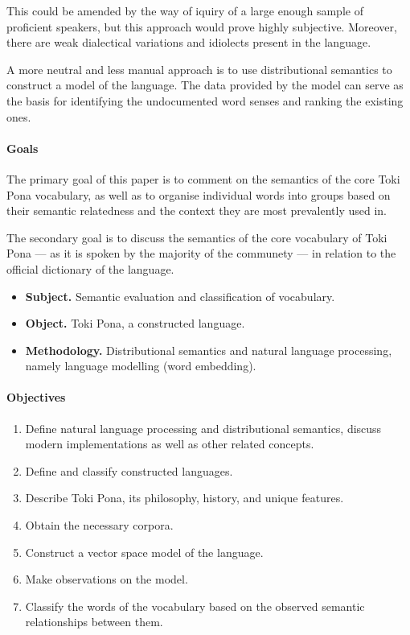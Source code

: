\documentclass[14pt, a4paper]{extreport}
\begin{document}
This could be amended by the way of iquiry of a large enough sample of proficient speakers, but this approach would prove highly subjective. Moreover, there are weak dialectical variations and idiolects present in the language.

A more neutral and less manual approach is to use distributional semantics to construct a model of the language. The data provided by the model can serve as the basis for identifying the undocumented word senses and ranking the existing ones.
\paragraph{Goals}
The primary goal of this paper is to comment on the semantics of the core Toki Pona vocabulary, as well as to organise individual words into groups based on their semantic relatedness and the context they are most prevalently used in.

The secondary goal is to discuss the semantics of the core vocabulary of Toki Pona --- as it is spoken by the majority of the communety --- in relation to the official dictionary of the language.

\begin{itemize}
  \item \textbf{Subject.} Semantic evaluation and classification of vocabulary.
  \item \textbf{Object.} Toki Pona, a constructed language.
  \item \textbf{Methodology.} Distributional semantics and natural language processing, namely language modelling (word embedding).
\end{itemize}
\paragraph{Objectives}
\begin{enumerate}
  \item Define natural language processing and distributional semantics, discuss modern implementations as well as other related concepts.
  \item Define and classify constructed languages.
  \item Describe Toki Pona, its philosophy, history, and unique features.
  \item Obtain the necessary corpora.
  \item Construct a vector space model of the language.
  \item Make observations on the model.
  \item Classify the words of the vocabulary based on the observed semantic relationships between them.
\end{enumerate}
\end{document}
